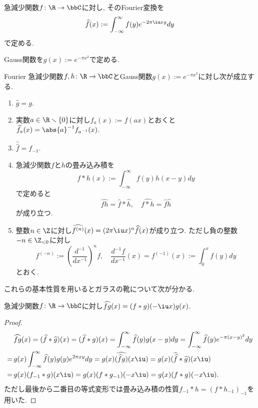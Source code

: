 \documentclass[11pt,b5paper,oneside,lualatex]{ltjsarticle} %
\renewcommand{\setminus}{\smallsetminus}
\numberwithin{equation}{section} %
\begin{document}
\begin{dfn}{}{}
	急減少関数$ f \colon \R \to \bbC $に対し, そのFourier変換を
	\[
	\widehat{f}(x) := \int_{-\infty}^{\infty} f(y) e^{-2\pi\iu xy} dy
	\]
	で定める. 
\end{dfn}

\begin{nota}{}{}
	Gauss関数を$ g(x) := e^{-\pi x^2} $で定める. 
\end{nota}

\begin{lem}{}{Fourier}
	急減少関数$ f, h \colon \R \to \bbC $とGauss関数$ g(x) := e^{-\pi x^2} $に対し次が成立する. 
	\begin{enumerate}
		\item $ \widehat{g} = g $.
		\item 実数$ a \in \R \setminus \{ 0 \} $に対し$ f_a(x) := f(ax) $とおくと
		$ \widehat{f_a}(x) = \abs{a}^{-1} f_{a^{-1}} (x) $.
		\item $ \widehat{\widehat{f}} = f_{-1} $.
		\item 急減少関数$ f $と$ h $の畳み込み積を
		\[
		f \ast h (x) := \int_{-\infty}^{\infty} f(y) h(x-y) dy
		\]
		で定めると
		\[
		\widehat{fh} = \widehat{f} \ast \widehat{h}, \quad
		\widehat{f \ast h} = \widehat{f} \widehat{h}
		\]
		 が成り立つ. 
		 \item \label{item:lem:Fourier_diff}
		 整数$ n \in \Z $に対し$ \widehat{f^{(n)}} (x) = (2 \pi \iu x)^n \widehat{f}(x) $が成り立つ. 
		 ただし負の整数$ -n \in \Z_{<0} $に対し
		 \[
		 f^{(-n)} := \left( \frac{d^{-1}}{dx^{-1}} \right)^n f, \quad
		 \frac{d^{-1} f}{dx^{-1}} (x) = f^{(-1)} (x) := \int_{0}^{x} f(y) dy
		 \]
		 とおく.
	\end{enumerate}
\end{lem}

これらの基本性質を用いるとガラスの靴について次が分かる. 

\begin{lem}{}{}
	急減少関数$ f \colon \R \to \bbC $に対し$ \widehat{fg}(x) = (f \ast g)(-\iu x) g(x)  $.
\end{lem}

\begin{proof}
	\begin{align}
		&\widehat{fg}(x) 
		=
		(\widehat{f} \ast \widehat{g}) (x)
		=
		(\widehat{f} \ast g) (x)
		=
		\int_{-\infty}^{\infty} \widehat{f} (y) g(x-y) dy
		=
		\int_{-\infty}^{\infty} \widehat{f} (y) e^{-\pi (x-y)^2} dy
		\\
		= \,
		&g(x) \int_{-\infty}^{\infty} \widehat{f} (y) g(y) e^{2\pi xy} dy
		=
		g(x) \widehat{(\widehat{f} g)} (x \iu)
		=
		g(x) ( \widehat{\widehat{f}} \ast \widehat{g}) (x \iu)
		\\
		= \,
		&g(x) ( f_{-1} \ast g) (x \iu)
		=
		g(x) ( f \ast g_{-1}) (-x \iu)
		=
		g(x) ( f \ast g) (-x \iu).
	\end{align}
	ただし最後から二番目の等式変形では畳み込み積の性質$ f_{-1} \ast h =  (f \ast h_{-1})_{-1} $を用いた. 
\end{proof}
\end{document}
